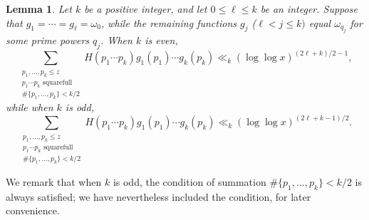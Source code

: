 \documentclass[12pt,reqno]{amsart}
\newtheorem{lemma}[theorem]{Lemma}
\theoremstyle{definition}
\begin{document}
\begin{lemma}
\label{unpaired off lemma}
Let $k$ be a positive integer, and let $0\le\ell\le k$ be an integer. Suppose that $g_1=\cdots=g_\ell=\omega_0$, while the remaining functions $g_j$ ($\ell<j\le k)$  equal $\omega_{q_j}$ for some prime powers $q_j$. When $k$ is even,
\begin{equation*}
\sum_{\substack{p_1,\dots,p_k \leq z \\ p_1\cdots p_k \text{ squarefull} \\ \#\{p_1,\dots,p_k\} < k/2}} H(p_1\cdots p_k) g_1(p_1) \cdots g_k(p_k) \ll_k (\log\log x)^{(2\ell + k)/2-1},
\end{equation*}
while when $k$ is odd,
\begin{equation*}
\sum_{\substack{p_1,\dots,p_k \leq z \\ p_1\cdots p_k \text{ squarefull} \\ \#\{p_1,\dots,p_k\} < k/2}} H(p_1\cdots p_k) g_1(p_1) \cdots g_k(p_k) \ll_k (\log\log x)^{(2\ell + k - 1)/2}.
\end{equation*}
\end{lemma}

\noindent We remark that when $k$ is odd, the condition of summation $\#\{p_1,\dots,p_k\} < k/2$ is always satisfied; we have nevertheless included the condition, for later convenience.
\end{document}
